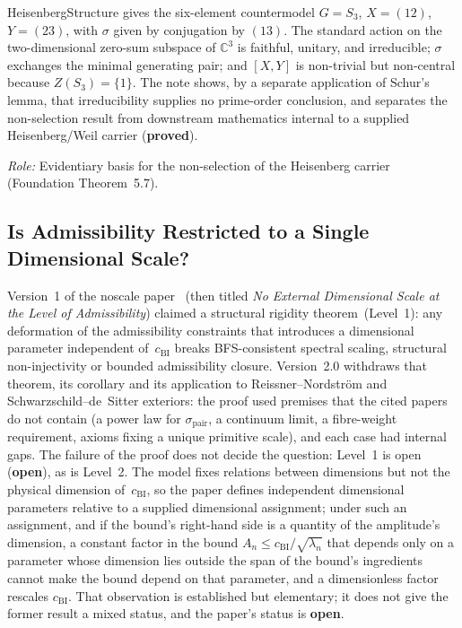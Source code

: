 \documentclass[11pt,a4paper]{article}
\newcommand{\sproved}{\textcolor{cproved}{\textbf{proved}}}
\newcommand{\sopen}{\textcolor{copen}{\textbf{open}}}
\begin{document}
    HeisenbergStructure gives the six-element countermodel
    \(G=S_3\), \(X=(12)\), \(Y=(23)\), with \(\sigma\) given by conjugation by \((13)\).
    The standard action on the two-dimensional zero-sum subspace of \(\mathbb{C}^3\) is faithful,
    unitary, and irreducible; \(\sigma\) exchanges the minimal generating pair; and
    \([X,Y]\) is non-trivial but non-central because \(Z(S_3)=\{1\}\).
    The note shows, by a separate application of Schur's lemma, that irreducibility supplies no prime-order
    conclusion, and separates the non-selection result from downstream mathematics internal to a supplied Heisenberg/Weil carrier (\sproved).

    \textit{Role:} Evidentiary basis for the non-selection of the Heisenberg carrier (Foundation
    Theorem~5.7).

  \subsection{Is Admissibility Restricted to a Single Dimensional Scale?}

    Version~1 of the noscale paper~\cite{Beau2026j} (then titled \emph{No External Dimensional Scale at the
    Level of Admissibility}) claimed a structural rigidity theorem~(Level~1):
    any deformation of the admissibility constraints that introduces a dimensional parameter
    independent of~$c_{\mathrm{BI}}$ breaks BFS-consistent spectral scaling, structural non-injectivity or
    bounded admissibility closure.
    Version~2.0 withdraws that theorem, its corollary and its application to Reissner--Nordstr\"om and
    Schwarzschild--de~Sitter exteriors: the proof used premises that the cited papers do not contain (a power
    law for $\sigma_{\mathrm{pair}}$, a continuum limit, a fibre-weight requirement, axioms fixing a unique
    primitive scale), and each case had internal gaps.
    The failure of the proof does not decide the question: Level~1 is open (\sopen), as is Level~2.
    The model fixes relations between dimensions but not the physical dimension of~$c_{\mathrm{BI}}$, so the
    paper defines independent dimensional parameters relative to a supplied dimensional assignment; under such
    an assignment, and if the bound's right-hand side is a quantity of the amplitude's dimension, a constant
    factor in the bound $A_n\le c_{\mathrm{BI}}/\sqrt{\lambda_n}$ that depends only on a parameter whose
    dimension lies outside the span of the bound's ingredients cannot make the bound depend on that parameter,
    and a dimensionless factor rescales $c_{\mathrm{BI}}$.
    That observation is established but elementary; it does not give the former result a mixed status, and the
    paper's status is \sopen.
\end{document}
